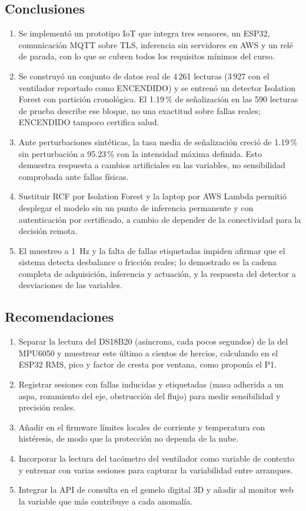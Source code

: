 \documentclass[10pt,twocolumn]{article}
\begin{document}
\subsection{Conclusiones}
\begin{enumerate}
  \item Se implementó un prototipo IoT que integra tres sensores, un ESP32, comunicación MQTT
        sobre TLS, inferencia sin servidores en AWS y un relé de parada, con lo que se cubren
        todos los requisitos mínimos del curso.
  \item Se construyó un conjunto de datos real de 4\,261 lecturas (3\,927 con el ventilador
        reportado como ENCENDIDO) y se entrenó un detector Isolation Forest con partición
        cronológica. El 1.19\,\% de señalización en las 590 lecturas de prueba describe ese bloque,
        no una exactitud sobre fallas reales; ENCENDIDO tampoco certifica salud.
  \item Ante perturbaciones sintéticas, la tasa media de señalización creció de 1.19\,\% sin
        perturbación a 95.23\,\% con la intensidad máxima definida. Esto demuestra respuesta a
        cambios artificiales en las variables, no sensibilidad comprobada ante fallas físicas.
  \item Sustituir RCF por Isolation Forest y la laptop por AWS Lambda permitió desplegar el modelo
        sin un punto de inferencia permanente y con autenticación por certificado, a cambio de
        depender de la conectividad para la decisión remota.
  \item El muestreo a 1~Hz y la falta de fallas etiquetadas impiden afirmar que el sistema detecta
        desbalance o fricción reales; lo demostrado es la cadena completa de adquisición,
        inferencia y actuación, y la respuesta del detector a desviaciones de las variables.
\end{enumerate}

\subsection{Recomendaciones}
\begin{enumerate}
  \item Separar la lectura del DS18B20 (asíncrona, cada pocos segundos) de la del MPU6050 y
        muestrear este último a cientos de hercios, calculando en el ESP32 RMS, pico y factor de
        cresta por ventana, como proponía el P1.
  \item Registrar sesiones con fallas inducidas y etiquetadas (masa adherida a un aspa, rozamiento
        del eje, obstrucción del flujo) para medir sensibilidad y precisión reales.
  \item Añadir en el firmware límites locales de corriente y temperatura con histéresis, de modo
        que la protección no dependa de la nube.
  \item Incorporar la lectura del tacómetro del ventilador como variable de contexto y entrenar con
        varias sesiones para capturar la variabilidad entre arranques.
  \item Integrar la API de consulta en el gemelo digital 3D y añadir al monitor web la variable
        que más contribuye a cada anomalía.
\end{enumerate}
\end{document}
